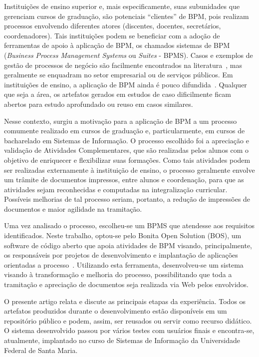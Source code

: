 \documentclass[12pt]{article}
\begin{document}
Instituições de ensino superior e, mais especificamente, suas subunidades que gerenciam cursos de graduação, são potenciais “clientes” de BPM, pois realizam processos envolvendo diferentes atores (discentes, docentes, secretários, coordenadores). Tais instituições podem se beneficiar com a adoção de ferramentas de apoio à aplicação de BPM, os chamados sistemas de BPM (\emph{Business Process Management Systems} ou \emph{Suites} - BPMS). Casos e exemplos de gestão de processos de negócio são facilmente encontrados na literatura~\cite{JestonNelis2012}, mas geralmente se enquadram no setor empresarial ou de serviços públicos. Em instituições de ensino, a aplicação de BPM ainda é pouco difundida~\cite{samia2010}. Qualquer que seja a área, os artefatos gerados em estudos de caso dificilmente ficam abertos para estudo aprofundado ou reuso em casos similares.

Nesse contexto, surgiu a motivação para a aplicação de BPM a um processo comumente realizado em cursos de graduação e, particularmente, em cursos de bacharelado em Sistemas de Informação.
O processo escolhido foi a apreciação e validação de Atividades Complementares, que são realizadas pelos alunos com o objetivo de enriquecer e flexibilizar suas formações. Como tais atividades podem ser realizadas externamente à instituição de ensino, o processo geralmente envolve um trâmite de documentos impressos, entre alunos e coordenação, para que as atividades sejam reconhecidas e computadas na integralização curricular. Possíveis melhorias de tal processo seriam, portanto, a redução de impressões de documentos e maior agilidade na tramitação.

Uma vez analisado o processo, escolheu-se um BPMS que atendesse aos requisitos identificados. Neste trabalho, optou-se pelo Bonita Open Solution (BOS), um software de código aberto que apoia atividades de BPM visando, principalmente, os responsáveis  por projetos de desenvolvimento e implantação de aplicações orientadas a processo~\cite{BONITASOFT}. Utilizando esta ferramenta, desenvolveu-se um sistema visando à transformação e melhoria do processo, possibilitando que toda a tramitação e apreciação de documentos seja realizada via Web pelos envolvidos.

O presente artigo relata e discute as principais etapas da experiência. Todos os artefatos produzidos durante o desenvolvimento estão disponíveis em um repositório público e podem, assim, ser reusados ou servir como recurso didático. O sistema desenvolvido passou por vários testes com usuários finais e encontra-se, atualmente, implantado no curso de Sistemas de Informação da Universidade Federal de Santa Maria.
\end{document}
